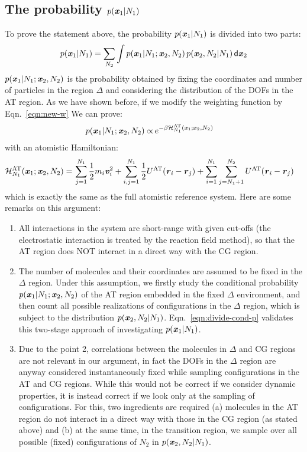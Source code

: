 \documentclass[aip,jcp,a4paper,reprint,onecolumn]{revtex4-1}
\newcommand{\vect}[1]{\textbf{\textit{#1}}}
\newcommand{\dd}[1]{\textsf{#1}}
\newcommand{\AT}{{\textrm{{AT}}}}
\newcommand{\HY}{{\Delta}}
\begin{document}
\subsection{The probability $p(\vect x_1 | N_1)$}
To prove the statement above, the probability $p(\vect x_1 | N_1)$ is divided into two parts:
\begin{align}\label{eqn:divide-cond-p}
  p(\vect x_1 | N_1) = \sum_{N_2}\int
  p(\vect x_1 | N_1; \vect x_2, N_2) \,
  p(\vect x_2, N_2 | N_1)
  \,\dd d\vect x_2
\end{align}
$p(\vect x_1 | N_1; \vect x_2, N_2)$ is the probability obtained by fixing the
coordinates and number of particles in the region $\HY$ and considering
the distribution of the DOFs in the AT region. As we have shown before,
if we modify the weighting function by Eqn.~\eqref{eqn:new-w}
We can prove:
\begin{align}
  p(\vect x_1 | N_1; \vect x_2, N_2)
  \propto &\,
  e^{-\beta\mathcal H_{N_1}^{\AT}(\vect x_1; \vect x_2, N_2)}
\end{align}
with an atomistic Hamiltonian:
\begin{align}
  \mathcal H_{N_1}^{{\AT}}(\vect x_1; \vect x_2, N_2) = &\,
  \sum_{j=1}^{N_1}\frac12 m_i\vect v_i^2 + 
  \sum_{i,j=1}^{N_1}\frac12 U^{{\AT}}(\vect r_i - \vect r_j)  +
  \sum_{i=1}^{N_1}\sum_{j=N_1+1}^{N_2} U^{{\AT}}(\vect r_i - \vect r_j)   
\end{align}
which is exactly the same as the full atomistic reference system.
Here are some remarks on this argument:
\begin{enumerate}\itemsep -1pt
\item All interactions in the system are short-range with given cut-offs (the
  electrostatic interaction is treated by the reaction field method),
  so that the AT region does NOT interact in a direct way with the CG region.
\item The number of molecules and their coordinates are assumed to be
  fixed in the $\HY$ region.  Under this assumption, we firstly study
  the conditional probability $p(\vect x_1 | N_1; \vect x_2, N_2)$ of
  the AT region embedded in the fixed $\HY$ environment, and then count
  all possible realizations of configurations in the $\HY$ region, which is subject to
  the distribution $p(\vect x_2, N_2 | N_1)$.
  Eqn.~\eqref{eqn:divide-cond-p} validates this two-stage approach of
  investigating $p(\vect x_1 | N_1)$.
\item Due to the point 2, correlations between the molecules
  in $\HY$ and CG regions are not relevant in our argument, in fact
  the DOFs in the $\HY$ region are anyway considered instantaneously fixed while sampling configurations in the AT and CG regions.
While this would not be correct if we consider dynamic properties, it is instead correct if we look only at the sampling of configurations. For this, two ingredients are required (a) molecules in the AT region do not interact in a direct way with those in the CG region (as stated above) and (b) at the same time, in the transition region, we sample over all possible (fixed) configurations of $N_{2}$ in $p(\vect x_2, N_2 | N_1)$. 
\end{enumerate}
\end{document}

